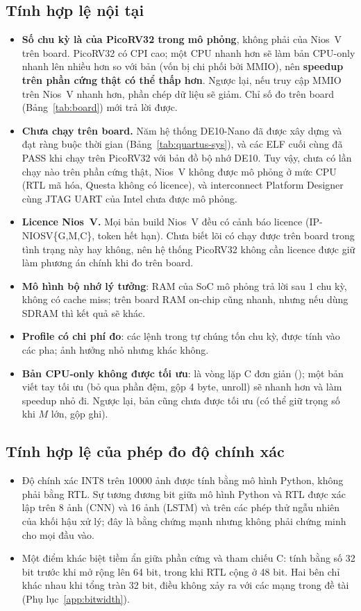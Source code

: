 \subsection{Tính hợp lệ nội tại}
\begin{itemize}
  \item \textbf{Số chu kỳ là của PicoRV32 trong mô phỏng}, không phải của Nios~V trên board. PicoRV32 có CPI cao; một CPU nhanh hơn sẽ làm bản CPU-only nhanh lên nhiều hơn so với bản \NPU{} (vốn bị chi phối bởi MMIO), nên \textbf{speedup trên phần cứng thật có thể thấp hơn}. Ngược lại, nếu truy cập MMIO trên Nios~V nhanh hơn, phần chép dữ liệu sẽ giảm. Chỉ số đo trên board (Bảng~\ref{tab:board}) mới trả lời được.
  \item \textbf{Chưa chạy trên board.} Năm hệ thống DE10-Nano đã được xây dựng và đạt ràng buộc thời gian (Bảng~\ref{tab:quartus-sys}), và các ELF cuối cùng đã PASS khi chạy trên PicoRV32 với bản đồ bộ nhớ DE10. Tuy vậy, chưa có lần chạy nào trên phần cứng thật, Nios~V không được mô phỏng ở mức CPU (RTL mã hóa, Questa không có licence), và interconnect Platform Designer cùng JTAG UART của Intel chưa được mô phỏng.
  \item \textbf{Licence Nios~V.} Mọi bản build Nios~V đều có cảnh báo licence (IP-NIOSV\{G,M,C\}, token hết hạn). Chưa biết lõi có chạy được trên board trong tình trạng này hay không, nên hệ thống PicoRV32 không cần licence được giữ làm phương án chính khi đo trên board.
  \item \textbf{Mô hình bộ nhớ lý tưởng}: RAM của SoC mô phỏng trả lời sau 1 chu kỳ, không có cache miss; trên board RAM on-chip cũng nhanh, nhưng nếu dùng SDRAM thì kết quả sẽ khác.
  \item \textbf{Profile có chi phí đo}: các lệnh  trong  tự chúng tốn chu kỳ, được tính vào các pha; ảnh hưởng nhỏ nhưng khác không.
  \item \textbf{Bản CPU-only không được tối ưu}:  là vòng lặp C đơn giản (); một bản viết tay tối ưu (bỏ qua phần đệm, gộp 4 byte, unroll) sẽ nhanh hơn và làm speedup nhỏ đi. Ngược lại, bản \NPU{} cũng chưa được tối ưu (có thể giữ trọng số khi $M$ lớn, gộp ghi).
\end{itemize}

\subsection{Tính hợp lệ của phép đo độ chính xác}
\begin{itemize}
  \item Độ chính xác INT8 trên \num{10000} ảnh được tính bằng mô hình Python, không phải bằng RTL. Sự tương đương bit giữa mô hình Python và RTL được xác lập trên 8 ảnh (CNN) và 16 ảnh (LSTM) và trên các phép thử ngẫu nhiên của khối hậu xử lý; đây là bằng chứng mạnh nhưng không phải chứng minh cho mọi đầu vào.
  \item Một điểm khác biệt tiềm ẩn giữa phần cứng và tham chiếu C:  tính  bằng số 32 bit trước khi mở rộng lên 64 bit, trong khi RTL cộng ở 48 bit. Hai bên chỉ khác nhau khi tổng tràn 32 bit, điều không xảy ra với các mạng trong đề tài (Phụ lục~\ref{app:bitwidth}).
\end{itemize}

